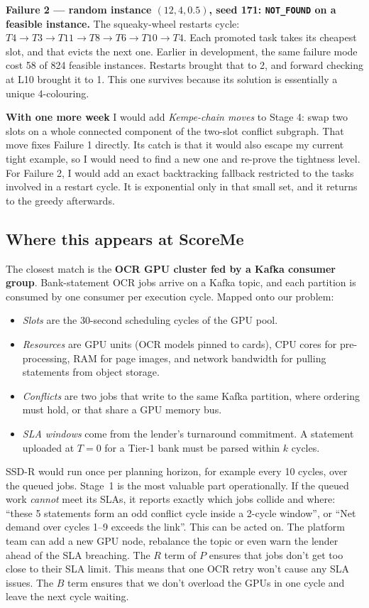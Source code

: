 \textbf{Failure 2 --- random instance $(12,4,0.5)$, seed 171:
\texttt{NOT\_FOUND} on a feasible instance.} The squeaky-wheel restarts
cycle: $T4\to T3\to T11\to T8\to T6\to T10\to T4$. Each promoted task takes
its cheapest slot, and that evicts the next one. Earlier in development,
the same failure mode cost 58 of 824 feasible instances. Restarts brought
that to 2, and forward checking at L10 brought it to 1. This one survives
because its solution is essentially a unique 4-colouring.

\textbf{With one more week} I would add \emph{Kempe-chain moves} to
Stage 4: swap two slots on a whole connected component of the two-slot
conflict subgraph. That move fixes Failure 1 directly. Its catch is that
it would also escape my current tight example, so I would need to find a
new one and re-prove the tightness level. For Failure 2, I would add an
exact backtracking fallback restricted to the tasks involved in a restart
cycle. It is exponential only in that small set, and it returns to the
greedy afterwards.

\subsection{Where this appears at ScoreMe}
The closest match is the \textbf{OCR GPU cluster fed by a Kafka consumer
group}. Bank-statement OCR jobs arrive on a Kafka topic, and each partition
is consumed by one consumer per execution cycle. Mapped onto our problem:
\begin{itemize}
\item \emph{Slots} are the 30-second scheduling cycles of the GPU pool.
\item \emph{Resources} are GPU units (OCR models pinned to cards), CPU
  cores for pre-processing, RAM for page images, and network bandwidth for
  pulling statements from object storage.
\item \emph{Conflicts} are two jobs that write to the same Kafka partition,
  where ordering must hold, or that share a GPU memory bus.
\item \emph{SLA windows} come from the lender's turnaround commitment. A
  statement uploaded at $T{=}0$ for a Tier-1 bank must be parsed within $k$
  cycles.
\end{itemize}
SSD-R would run once per planning horizon, for example every 10 cycles,
over the queued jobs. Stage~1 is the most valuable part operationally. If
the queued work \emph{cannot} meet its SLAs, it reports exactly which jobs
collide and where: ``these 5 statements form an odd conflict cycle inside a
2-cycle window'', or ``Net demand over cycles 1--9 exceeds the link''.
This can be acted on. The platform team can add a new GPU node, rebalance
the topic or even warn the lender ahead of the SLA breaching. The $R$ term
of $P$ ensures that jobs don't get too close to their SLA limit. This means
that one OCR retry won't cause any SLA issues. The $B$ term ensures that we
don't overload the GPUs in one cycle and leave the next cycle waiting.

